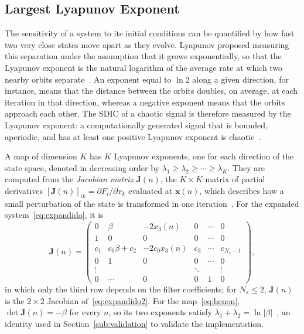 \documentclass[journal]{IEEEtran}
\begin{document}
\subsection{Largest Lyapunov Exponent}\label{sub:lyap}
The sensitivity of a system to its initial conditions can be quantified by
how fast two very close states move apart as they evolve. Lyapunov proposed
measuring this separation under the assumption that it grows exponentially,
so that the Lyapunov exponent is the natural logarithm of the average rate at
which two nearby orbits separate~\cite{Alligood1996,Borges2022sbrt}. An
exponent equal to $\ln2$ along a given direction, for instance, means that the
distance between the orbits doubles, on average, at each iteration in that
direction, whereas a negative exponent means that the orbits approach each
other. The SDIC of a chaotic signal is therefore measured by the Lyapunov
exponent: a computationally generated signal that is bounded, aperiodic, and
has at least one positive Lyapunov exponent is chaotic~\cite{Alligood1996}.

A map of dimension $K$ has $K$ Lyapunov exponents, one for each direction of
the state space, denoted in decreasing order by
$\lambda_1\ge\lambda_2\ge\cdots\ge\lambda_K$. They are computed from the
\emph{Jacobian matrix} $\mathbf{J}(n)$, the $K\times K$ matrix of partial
derivatives $[\mathbf{J}(n)]_{ik}=\partial F_i/\partial x_k$ evaluated at
$\mathbf{x}(n)$, which describes how a small perturbation of the state is
transformed in one iteration~\cite{Alligood1996}. For the expanded
system~\eqref{eq:expandido}, it is~\cite{Borges2022sbrt,BorgesCNSNS2024}
\begin{equation}
  \mathbf{J}(n) = \begin{pmatrix}
    0 & \beta & -2x_3(n) & 0 & \cdots & 0 \\
    1 & 0 & 0 & 0 & \cdots & 0 \\
    c_1 & c_0\beta + c_2 & -2c_0 x_3(n) & c_3 & \cdots & c_{N_s-1} \\
    0 & 1 & 0 & 0 & \cdots & 0 \\
    \vdots & & & \ddots & & \vdots \\
    0 & \cdots & 0 & 0 & 1 & 0
  \end{pmatrix},
  \label{eq:jacobiana}
\end{equation}
in which only the third row depends on the filter coefficients; for
$N_s\le2$, $\mathbf{J}(n)$ is the $2\times2$ Jacobian
of~\eqref{eq:expandido2}. For the map~\eqref{eq:henon}, $\det\mathbf{J}(n)=-\beta$
for every $n$, so its two exponents satisfy
$\lambda_1+\lambda_2=\ln|\beta|$~\cite{Alligood1996}, an identity used in
Section~\ref{sub:validation} to validate the implementation.
\end{document}
